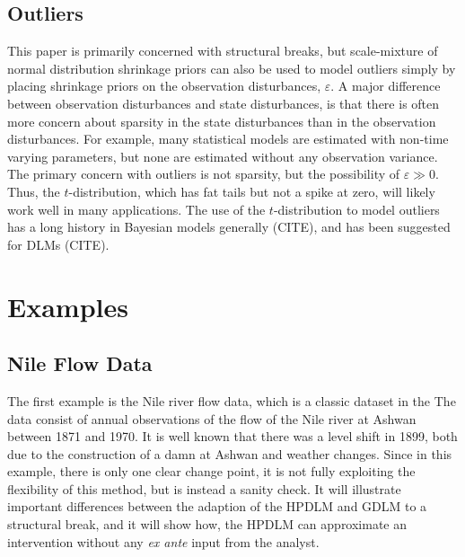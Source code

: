\documentclass{article}
\begin{document}
\subsection{Outliers}
\label{sec:outliers}

This paper is primarily concerned with structural breaks, but scale-mixture of normal distribution shrinkage priors can also be used to model outliers simply
by placing shrinkage priors on the observation disturbances, $\varepsilon$.
A major difference between observation disturbances and state disturbances, is that there is often more concern about sparsity in the state disturbances than in the observation disturbances.
For example, many statistical models are estimated with non-time varying parameters, but none are estimated without any observation variance.
The primary concern with outliers is not sparsity, but the possibility of $\varepsilon \gg 0$.
Thus, the $t$-distribution, which has fat tails but not a spike at zero, will likely work well in many applications.
The use of the $t$-distribution to model outliers has a long history in Bayesian models generally (CITE), and has been suggested for DLMs (CITE).


\section{Examples}
\label{sec:examples}


\subsection{Nile Flow Data}
\label{sec:nile}

The first example is the Nile river flow data, which is a classic dataset in the  \parencites{Cobb1978}{Balke1993}{JongPenzer1998}{DurbinKoopman2001}{DurbinKoopman2012}
The data consist of annual observations of the flow of the Nile river at Ashwan between 1871 and 1970.
It is well known that there was a level shift in 1899, both due to the construction of a damn at Ashwan and weather changes.
Since in this example, there is only one clear change point, it is not fully exploiting the flexibility of this method, but is instead a sanity check.
It will illustrate important differences between the adaption of the HPDLM and GDLM to a structural break,
and it will show how, the HPDLM can approximate an intervention without any \textit{ex ante} input from the analyst.
\end{document}
